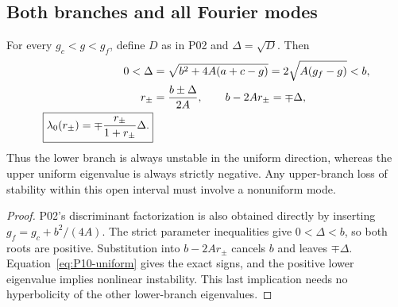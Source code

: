 \subsection{Both branches and all Fourier modes}
\label{slot:P10-2}

\begin{proposition}
\label{prop:P10-branch-signs}
For every $g_c<g<g_f$, define $D$ as in P02 and $\Delta=\sqrt D$.
Then
\begin{align}
 0<\Delta&=\sqrt{b^2+4A(a+c-g)}=2\sqrt{A(g_f-g)}<b,\notag\\
 r_\pm&=\frac{b\pm\Delta}{2A},\qquad
 b-2Ar_\pm=\mp\Delta,\label{eq:P10-discriminant}\\
 \boxed{\lambda_0(r_\pm)=\mp\frac{r_\pm}{1+r_\pm}\Delta.}
 \label{eq:P10-branch-eigenvalues}
\end{align}
Thus the lower branch is always unstable in the uniform direction,
whereas the upper uniform eigenvalue is always strictly negative.
Any upper-branch loss of stability within this open interval must
involve a nonuniform mode.
\end{proposition}
\begin{proof}
P02's discriminant factorization is also obtained directly by inserting
$g_f=g_c+b^2/(4A)$. The strict parameter inequalities give $0<\Delta<b$,
so both roots are positive. Substitution into $b-2Ar_\pm$ cancels
$b$ and leaves $\mp\Delta$. Equation~\eqref{eq:P10-uniform}
gives the exact signs, and the positive lower eigenvalue implies
nonlinear instability. This last implication needs no hyperbolicity
of the other lower-branch eigenvalues.
\end{proof}


